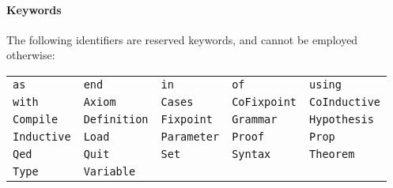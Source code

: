 \paragraph{Keywords}
The following identifiers are reserved keywords, and cannot be
employed otherwise:
\begin{center}
\begin{tabular}{lllll}
\verb!as!         &
\verb!end!        &
\verb!in!         &
\verb!of!         &
\verb!using!      \\
\verb!with!       &
\verb!Axiom!      &
\verb!Cases!      &
\verb!CoFixpoint! &
\verb!CoInductive!\\
\verb!Compile!    &
\verb!Definition! &
\verb!Fixpoint!   &
\verb!Grammar!    &
\verb!Hypothesis! \\
\verb!Inductive!  &
\verb!Load!       &
\verb!Parameter!  &
\verb!Proof!      &
\verb!Prop!       \\
\verb!Qed!        &
\verb!Quit!       &
\verb!Set!        &
\verb!Syntax!     &
\verb!Theorem!    \\
\verb!Type!       &
\verb!Variable!   & & &
\end{tabular}
\end{center}

